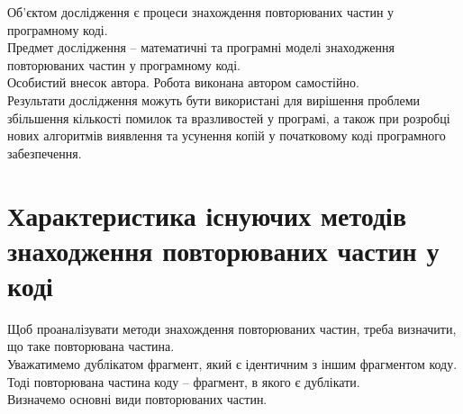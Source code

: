\documentclass[a4paper, 14pt]{article}
\begin{document}
Об’єктом дослідження є процеси знахождення повторюваних частин у програмному коді. \\
Предмет дослідження – математичні та програмні моделі знаходження повторюваних частин у програмному коді. \\
Особистий внесок автора. Робота виконана автором самостійно. \\
Результати дослідження можуть бути використані для вирішення проблеми збільшення кількості помилок та вразливостей у програмі, а також при розробці нових алгоритмів виявлення та усунення копій у початковому коді програмного забезпечення.
\newpage
\section{Характеристика існуючих методів знаходження повторюваних частин у коді}
\label{sec:characteristics}
Щоб проаналізувати методи знахождення повторюваних частин, треба визначити, що таке повторювана частина. \\
Уважатимемо дублікатом фрагмент, який є ідентичним з іншим фрагментом коду. \\
Тоді повторювана частина коду -- фрагмент, в якого є дублікати. \\
Визначемо основні види повторюваних частин.
\end{document}
